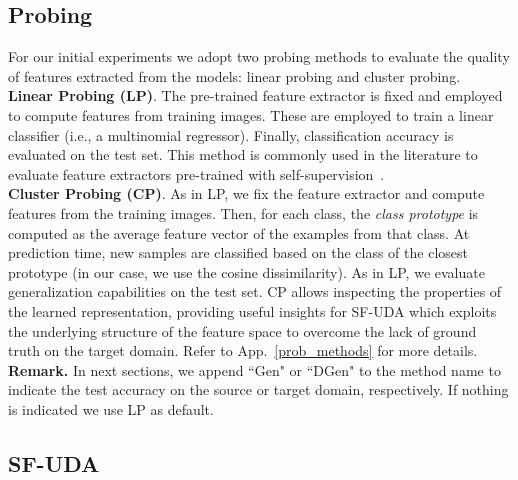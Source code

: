 \documentclass{article}
\begin{document}
\subsection{Probing}
For our initial experiments we adopt two probing methods to evaluate the quality of features extracted from the models: linear probing and cluster probing.\\
\textbf{Linear Probing (LP)}. 
The pre-trained feature extractor is fixed and employed to compute features from training images. 
These are employed to train a linear classifier (i.e., a multinomial regressor). Finally, classification accuracy is evaluated on the test set. This method is commonly used in the literature to evaluate feature extractors pre-trained with self-supervision~\citep{chen2021empirical}.\\
\textbf{Cluster Probing (CP)}. 
As in LP, we fix the feature extractor and compute features from the training images.
Then, for each class, the \textit{class prototype} is computed as the average feature vector of the examples from that class. 
At prediction time, new samples are classified based on the class of the closest prototype (in our case, we use the cosine dissimilarity). 
As in LP, we evaluate generalization capabilities on the test set. 
CP allows inspecting the properties of the learned representation, 
providing useful insights for SF-UDA which exploits the 
underlying structure of the feature space
to overcome the lack of ground truth on the target domain. Refer to App.~\ref{prob_methods} for more details.\\
\textbf{Remark.} In next sections, we append  ``Gen" or ``DGen" to the method name to indicate the test accuracy on the source or target domain, respectively. If nothing is indicated we use LP as default.
\subsection{SF-UDA}
\label{sf_uda}
\end{document}
